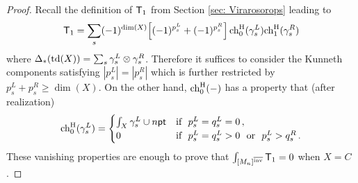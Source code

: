 \documentclass[a4paper, 12pt]{amsart}
\begin{document}
\begin{appendices}
\begin{proof}
Recall the definition of ${\mathsf{T}}_1$ from Section \ref{sec: Virarosorops} leading to
\begin{align*}
    {\mathsf{T}}_1=\sum_s (-1)^{\dim(X)}\Big[(-1)^{p_s^L}+(-1)^{p_s^R}\Big]\,\mathrm{ch}_0^{\mathrm{H}}(\gamma_s^L)\mathrm{ch}_1^{\mathrm{H}}(\gamma_s^R)
\end{align*}
where $\Delta_*(\mathrm{td}(X))=\sum_s \gamma_s^L\otimes \gamma_s^R$. Therefore it suffices to consider the Kunneth components satisfying $|p_s^L|=|p_s^R|$ which is further restricted by $p_s^L+p_s^R\geq \dim(X)$. On the other hand, $\mathrm{ch}_0^{\mathrm{H}}(-)$ has a property that (after realization) 
$$\ch_0^\HH(\gamma_s^L)=\begin{cases}
\int_X \gamma_s^L\cup n\pt &\textnormal{if}\ \  p_s^L=q_s^L=0\,,\\
0&\textnormal{if}\ \ p_s^L=q_s^L>0 \ \textnormal{ or } \ p_s^L>q_s^R\,.
\end{cases}
$$
These vanishing properties are enough to prove that $\int_{[M_{n}]^{\overline{\mathrm{inv}}}} {\mathsf{T}}_{1}=0$ when $X=C$. 


\end{proof}
\end{appendices}
\end{document}
